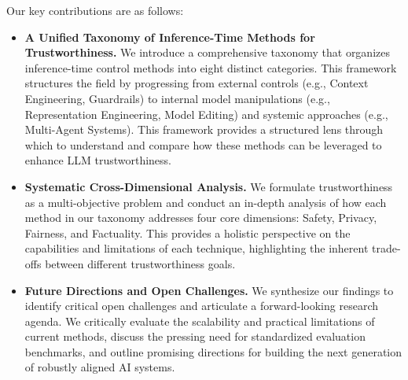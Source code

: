 Our key contributions are as follows:

\begin{itemize}
    \item \textbf{A Unified Taxonomy of Inference-Time Methods for Trustworthiness.} We introduce a comprehensive taxonomy that organizes inference-time control methods into eight distinct categories. This framework structures the field by progressing from external controls (e.g., Context Engineering, Guardrails) to internal model manipulations (e.g., Representation Engineering, Model Editing) and systemic approaches (e.g., Multi-Agent Systems). This framework provides a structured lens through which to understand and compare how these methods can be leveraged to enhance LLM trustworthiness.
    \item \textbf{Systematic Cross-Dimensional Analysis.} We formulate trustworthiness as a multi-objective problem and conduct an in-depth analysis of how each method in our taxonomy addresses four core dimensions: Safety, Privacy, Fairness, and Factuality. This provides a holistic perspective on the capabilities and limitations of each technique, highlighting the inherent trade-offs between different trustworthiness goals.
    \item \textbf{Future Directions and Open Challenges.} We synthesize our findings to identify critical open challenges and articulate a forward-looking research agenda. We critically evaluate the scalability and practical limitations of current methods, discuss the pressing need for standardized evaluation benchmarks, and outline promising directions for building the next generation of robustly aligned AI systems.
\end{itemize}


